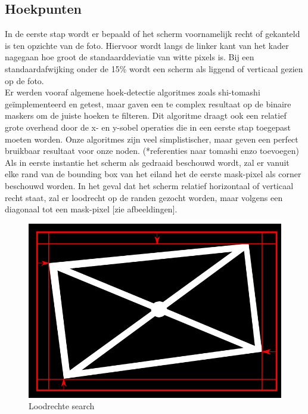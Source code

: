 \subsection{Hoekpunten}
In de eerste stap wordt er bepaald of het scherm voornamelijk recht of gekanteld is ten opzichte van de foto. Hiervoor wordt langs de linker kant van het kader nagegaan hoe groot de standaarddeviatie van witte pixels is. Bij een standaardafwijking onder de 15\% wordt een scherm als liggend of verticaal gezien op de foto.\\
Er werden vooraf algemene hoek-detectie algoritmes zoals shi-tomashi geïmplementeerd en getest, maar gaven een te complex resultaat op de binaire maskers om de juiste hoeken te filteren. Dit algoritme draagt ook een relatief grote overhead door de x- en y-sobel operaties die in een eerste stap toegepast moeten worden. Onze algoritmes zijn veel simplistischer, maar geven een perfect bruikbaar resultaat voor onze noden. (*referenties naar tomashi enzo toevoegen)\\
Als in eerste instantie het scherm als gedraaid beschouwd wordt, zal er vanuit elke rand van de bounding box van het eiland het de eerste mask-pixel als corner beschouwd worden. In het geval dat het scherm relatief horizontaal of verticaal recht staat, zal er loodrecht op de randen gezocht worden, maar volgens een diagonaal tot een mask-pixel [zie afbeeldingen].\\

\begin{figure}[h]
\centering
\includegraphics[scale=0.6]{img/perpSearch.png}
\caption{Loodrechte search}
\end{figure}

